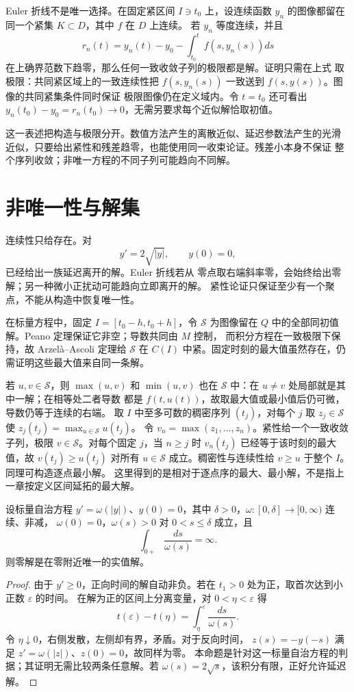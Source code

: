 Euler 折线不是唯一选择。在固定紧区间 \(I\ni t_0\) 上，设连续函数
\(y_n\) 的图像都留在同一个紧集 \(K\subset D\)，其中 \(f\) 在 \(D\) 上连续。
若 \(y_n\) 等度连续，并且
\[
 r_n(t)=y_n(t)-y_0-\int_{t_0}^{t}f(s,y_n(s))ds
\]
在上确界范数下趋零，那么任何一致收敛子列的极限都是解。证明只需在上式
取极限：共同紧区域上的一致连续性把
\(f(s,y_n(s))\) 一致送到 \(f(s,y(s))\)。图像的共同紧集条件同时保证
极限图像仍在定义域内。令 \(t=t_0\) 还可看出
\(y_n(t_0)-y_0=r_n(t_0)\to0\)，无需另要求每个近似解恰取初值。

这一表述把构造与极限分开。数值方法产生的离散近似、延迟参数法产生的光滑
近似，只要给出紧性和残差趋零，也能使用同一收束论证。残差小本身不保证
整个序列收敛；非唯一方程的不同子列可能趋向不同解。

\section{非唯一性与解集}

连续性只给存在。对
\[
 y'=2\sqrt{|y|},\qquad y(0)=0,
\]
已经给出一族延迟离开的解。Euler 折线若从
零点取右端斜率零，会始终给出零解；另一种微小正扰动可能趋向立即离开的解。
紧性论证只保证至少有一个聚点，不能从构造中恢复唯一性。

在标量方程中，固定 \(I=[t_0-h,t_0+h]\)，令 \(\mathcal S\) 为图像留在
\(Q\) 中的全部同初值解。Peano 定理保证它非空；导数共同由 \(M\) 控制，
而积分方程在一致极限下保持，故 Arzelà--Ascoli 定理给 \(\mathcal S\)
在 \(C(I)\) 中紧。固定时刻的最大值虽然存在，仍需证明这些最大值来自同一条解。

若 \(u,v\in\mathcal S\)，则 \(\max(u,v)\) 和 \(\min(u,v)\) 也在
\(\mathcal S\) 中：在 \(u\ne v\) 处局部就是其中一解；在相等处二者导数
都是 \(f(t,u(t))\)，故取最大值或最小值后仍可微，导数仍等于连续的右端。
取 \(I\) 中至多可数的稠密序列 \((t_j)\)，对每个 \(j\) 取
\(z_j\in\mathcal S\) 使 \(z_j(t_j)=\max_{u\in\mathcal S}u(t_j)\)。
令 \(v_n=\max(z_1,\ldots,z_n)\)。紧性给一个一致收敛子列，极限
\(v\in\mathcal S\)。对每个固定 \(j\)，当 \(n\ge j\) 时 \(v_n(t_j)\)
已经等于该时刻的最大值，故 \(v(t_j)\ge u(t_j)\) 对所有 \(u\in\mathcal S\)
成立。稠密性与连续性给 \(v\ge u\) 于整个 \(I\)。同理可构造逐点最小解。
这里得到的是相对于逐点序的最大、最小解，不是指上一章按定义区间延拓的最大解。

\begin{proposition}\label{prop:osgood-uniqueness}
设标量自治方程 \(y'=\omega(|y|)\)、\(y(0)=0\)，其中
\(\delta>0\)，\(\omega:[0,\delta]\to[0,\infty)\) 连续、非减，
\(\omega(0)=0\)，\(\omega(s)>0\) 对 \(0<s\le\delta\) 成立，且
\[
 \int_{0+}\frac{ds}{\omega(s)}=\infty.
\]
则零解是在零附近唯一的实值解。
\end{proposition}
\begin{proof}
由于 \(y'\ge0\)，正向时间的解自动非负。若在 \(t_1>0\) 处为正，取首次达到小正数 \(\varepsilon\) 的时间。
在解为正的区间上分离变量，对 \(0<\eta<\varepsilon\) 得
\[
 t(\varepsilon)-t(\eta)=\int_\eta^\varepsilon\frac{ds}{\omega(s)}.
\]
令 \(\eta\downarrow0\)，右侧发散，左侧却有界，矛盾。对于反向时间，
\(z(s)=-y(-s)\) 满足 \(z'=\omega(|z|)\)、\(z(0)=0\)，故同样为零。
本命题是针对这一标量自治方程的判据；其证明无需比较两条任意解。若
\(\omega(s)=2\sqrt s\)，该积分有限，正好允许延迟解。
\end{proof}

